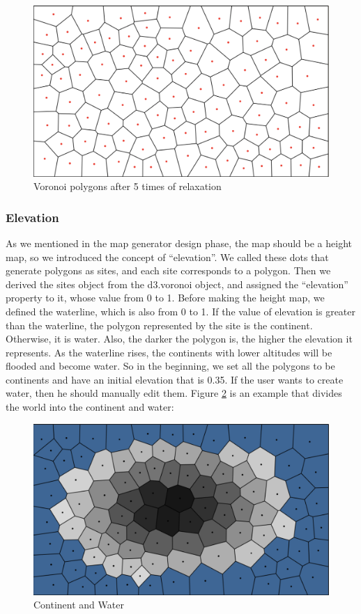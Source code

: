 \begin{figure}[htbp]
  \includegraphics[width=\textwidth]{section04/assets/Map-voronoi-relaxation.png}
  \caption{Voronoi polygons after 5 times of relaxation}
  \label{fig:Voronoi relaxed polygons}
\end{figure}

\subsubsection{Elevation}
As we mentioned in the map generator design phase, the map should be a height map, so we introduced the concept of ``elevation''. We called these dots that generate polygons as sites, and each site corresponds to a polygon. Then we derived the sites object from the d3.voronoi object, and assigned the ``elevation'' property to it, whose value from 0 to 1. Before making the height map, we defined the waterline, which is also from 0 to 1. If the value of elevation is greater than the waterline, the polygon represented by the site is the continent. Otherwise, it is water. Also, the darker the polygon is, the higher the elevation it represents. As the waterline rises, the continents with lower altitudes will be flooded and become water. So in the beginning, we set all the polygons to be continents and have an initial elevation that is 0.35. If the user wants to create water, then he should manually edit them. Figure \ref{fig:Height Map} is an example that divides the world into the continent and water:

\begin{figure}[htbp]
  \includegraphics[width=\textwidth]{section04/assets/Map-heightmap.png}
  \caption{Continent and Water}
  \label{fig:Height Map}
\end{figure}

